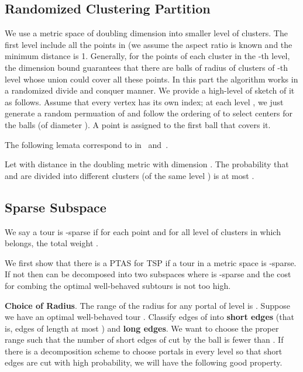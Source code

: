 \documentclass{llncs}
\begin{document}
\subsection{Randomized Clustering Partition}
We use a metric space  of doubling dimension into smaller level of clusters.
The first level include all the points in  (we assume the aspect ratio  is known and the minimum distance is 1.
Generally, for the points of each cluster in the -th level, the dimension bound guarantees that there are  balls of radius  of clusters of -th level whose union could cover all these points.
In this part the algorithm works in a randomized divide and conquer manner.
We provide a high-level of sketch of it as follows.
Assume that every vertex has its own index; at each level , we just generate a random permuation  of  and follow the ordering of  to select centers for the balls (of diameter ).
A point is assigned to the first ball that covers it.

The following lemata correspond to in~\cite{Talwar04} and~\cite{Bartal12}. 

\begin{lemma}
Let  with distance  in the doubling metric  with dimension . 
The probability that  and  are divided into different clusters (of the same level ) is at most .
\end{lemma}

\subsection{Sparse Subspace}
\begin{definition}[Sparsity]
We say a tour  is -sparse if for each point  and for all level of clusters in which  belongs, the total weight . 
\end{definition}



We first show that there is a PTAS for TSP if a tour  in a metric space  is -sparse. 
If not then  can be decomposed into two subspaces  where  is -sparse and the cost for combing the optimal well-behaved subtours is not too high.

\textbf{Choice of Radius}. The range of the radius for any portal  of level  is .
Suppose we have an optimal well-behaved tour .
Classify edges of  into \textbf{short edges} (that is, edges of length at most ) and \textbf{long edges}.
We want to choose the proper range  such that the number of short edges of  cut by the ball  is fewer than .
If there is a decomposition scheme to choose portals in every level so that short edges are cut with high probability, we will have the following good property.
\end{document}
